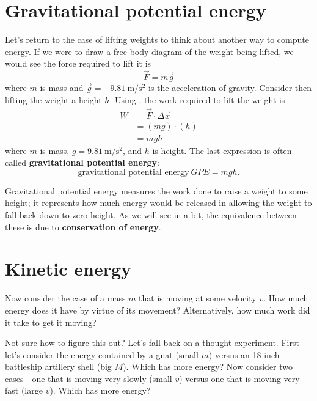 \documentclass[handout]{tufte-handout}
\begin{document}
\section{Gravitational potential energy}
Let's return to the case of lifting weights to think about another way to compute energy. If we were to draw a free body diagram of the weight being lifted, we would see the force required to lift it is 
\begin{equation}
\vec{F}=m\vec{g}
\end{equation}
where $m$ is mass and $\vec{g}=\SI{-9.81}{\meter\per\second\squared}$ is the acceleration of gravity. Consider then lifting the weight a height $h$. Using , the work required to lift the weight is 
\begin{align}
W &= \vec{F}\cdot\Delta\vec{x} \\
&= (m g) \cdot (h) \\
&= mgh 
\end{align}
where $m$ is mass, $g=\SI{9.81}{\meter\per\second\squared}$, and $h$ is height. The last expression is often called \textbf{gravitational potential energy}:
\begin{equation}
\text{gravitational potential energy}\ GPE = mgh .
\end{equation} 

Gravitational potential energy measures the work done to raise a weight to some height; it represents how much energy would be released in allowing the weight to fall back down to zero height. As we will see in a bit, the equivalence between these is due to \textbf{conservation of energy}. 




\section{Kinetic energy}
Now consider the case of a mass $m$ that is moving at some velocity $v$. How much energy does it have by virtue of its movement? Alternatively, how much work did it take to get it moving? 

Not sure how to figure this out? Let's fall back on a thought experiment. First let's consider the energy contained by a gnat (small $m$) versus an 18-inch battleship artillery shell (big $M$). Which has more energy?  Now consider two cases - one that is moving very slowly (small $v$) versus one that is moving very fast (large $v$). Which has more energy? 
\end{document}
